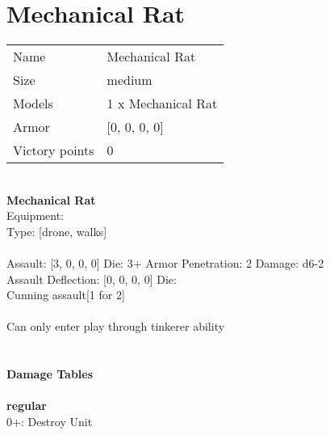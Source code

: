 \pagebreak

\section{ Mechanical Rat }

\begin{tabular}{ll}
  Name & Mechanical Rat \\
  Size & medium\\
  Models & 1 x Mechanical Rat\\
  Armor & [0, 0, 0, 0]\\
  Victory points & 0\\
\end{tabular}

\\ 


{\bf Mechanical Rat } \\
Equipment:  \\
Type: [drone, walks] \\
\ \\
Assault: [3, 0, 0, 0] Die: 3+ Armor Penetration: 2 Damage: d6-2 \\
Assault Deflection: [0, 0, 0, 0] Die: \\
\indent Cunning assault[1 for 2]\\ 
 
\ \\
Can only enter play through tinkerer ability\\ 

\ \\
 
\ \\




{\bf Damage Tables} \\
\ \\ {\bf regular } \\
0+: Destroy Unit \\










